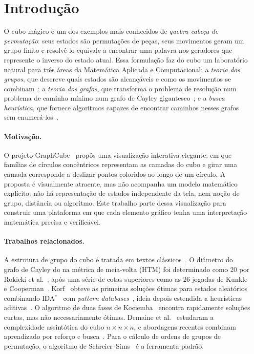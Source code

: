 \section{Introdução}\label{sec:intro}

O cubo mágico é um dos exemplos mais conhecidos de \emph{quebra-cabeça de permutação}: seus estados são permutações de peças, seus movimentos geram um grupo finito e resolvê-lo equivale a encontrar uma palavra nos geradores que represente o inverso do estado atual. Essa formulação faz do cubo um laboratório natural para três áreas da Matemática Aplicada e Computacional: a \emph{teoria dos grupos}, que descreve quais estados são alcançáveis e como os movimentos se combinam~\cite{joyner2008,singmaster1981}; a \emph{teoria dos grafos}, que transforma o problema de resolução num problema de caminho mínimo num grafo de Cayley gigantesco~\cite{godsil2001,rokicki2014}; e a \emph{busca heurística}, que fornece algoritmos capazes de encontrar caminhos nesses grafos sem enumerá-los~\cite{hart1968,korf1985,korf1997}.

\paragraph{Motivação.} O projeto GraphCube~\cite{laguna2024} propôs uma visualização interativa elegante, em que famílias de círculos concêntricos representam as camadas do cubo e girar uma camada corresponde a deslizar pontos coloridos ao longo de um círculo. A proposta é visualmente atraente, mas não acompanha um modelo matemático explícito: não há representação de estados independente da tela, nem noção de grupo, distância ou algoritmo. Este trabalho parte dessa visualização para construir uma plataforma em que cada elemento gráfico tenha uma interpretação matemática precisa e verificável.

\paragraph{Trabalhos relacionados.} A estrutura de grupo do cubo é tratada em textos clássicos~\cite{singmaster1981,frey1982,joyner2008}. O diâmetro do grafo de Cayley do  na métrica de meia-volta (HTM) foi determinado como 20 por Rokicki et al.~\cite{rokicki2014}, após uma série de cotas superiores como as 26 jogadas de Kunkle e Cooperman~\cite{kunkle2007}. Korf~\cite{korf1997} obteve as primeiras soluções ótimas para estados aleatórios combinando IDA$^*$~\cite{korf1985} com \textit{pattern databases}~\cite{culberson1998}, ideia depois estendida a heurísticas aditivas~\cite{felner2004}. O algoritmo de duas fases de Kociemba~\cite{kociemba1992,kociembaweb} encontra rapidamente soluções curtas, mas não necessariamente ótimas. Demaine et al.~\cite{demaine2011} estudaram a complexidade assintótica do cubo $n\times n\times n$, e abordagens recentes combinam aprendizado por reforço e busca~\cite{agostinelli2019}. Para o cálculo de ordens de grupos de permutação, o algoritmo de Schreier--Sims~\cite{sims1970,seress2003,holt2005} é a ferramenta padrão.

